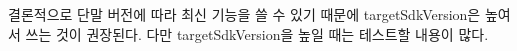 결론적으로 단말 버전에 따라 최신 기능을 쓸 수 있기 때문에 targetSdkVersion은 높여서 쓰는 것이 권장된다. 다만 targetSdkVersion을 높일 때는 테스트할 내용이 많다.

